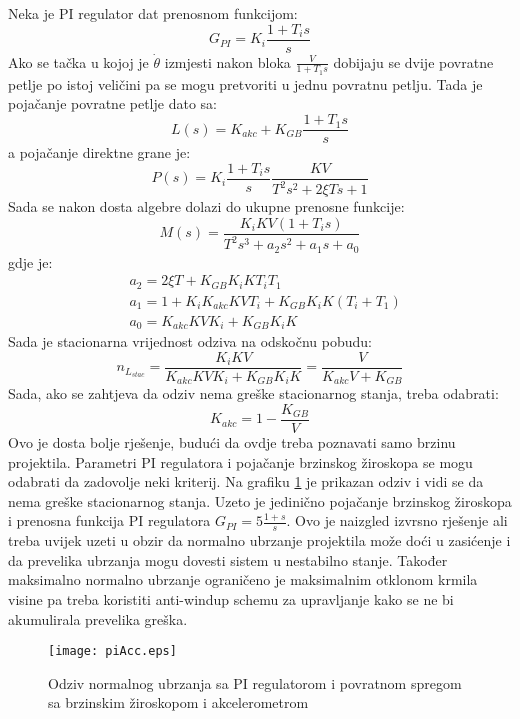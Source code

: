 Neka je PI regulator dat prenosnom funkcijom:
\begin{equation}
    G_{PI} = K_i\frac{1+T_is}{s}
\end{equation}
Ako se tačka u kojoj je $\dot{\theta}$ izmjesti nakon bloka $\frac{V}{1+T_1s}$ dobijaju se 
dvije povratne petlje po istoj veličini pa se mogu pretvoriti u jednu povratnu petlju. Tada je 
pojačanje povratne petlje dato sa:
\begin{equation}
    L(s) = K_{akc}+K_{GB}\frac{1+T_1s}{s}
\end{equation}
a pojačanje direktne grane je:
\begin{equation}
    P(s)=K_i\frac{1+T_is}{s}\frac{KV}{T^2s^2+2\xi Ts+1}
\end{equation}
Sada se nakon dosta algebre dolazi do ukupne prenosne funkcije:
\begin{equation}
    M(s)=\frac{K_iKV(1+T_is)}{T^2s^3+a_2s^2+a_1s + a_0}
\end{equation}
gdje je:
\begin{align*}
    & a_2 = 2\xi T+K_{GB}K_iKT_iT_1 \\
    & a_1 = 1+K_iK_{akc}KVT_i+K_{GB}K_iK(T_i+T_1)\\
    & a_0 = K_{akc}KVK_i+K_{GB}K_iK
\end{align*}
Sada je stacionarna vrijednost odziva na odskočnu pobudu:
\begin{equation}
    n_{L_{stac}} = \frac{K_iKV}{K_{akc}KVK_i+K_{GB}K_iK} = \frac{V}{K_{akc}V+K_{GB}}
\end{equation}
Sada, ako se zahtjeva da odziv nema greške stacionarnog stanja, treba odabrati:
\begin{equation}
    K_{akc} = 1-\frac{K_{GB}}{V}
\end{equation}
Ovo je dosta bolje rješenje, budući da ovdje treba poznavati samo brzinu projektila. Parametri 
PI regulatora i pojačanje brzinskog žiroskopa se mogu odabrati da zadovolje neki kriterij. 
Na grafiku \ref{fig:piAcc} je prikazan odziv i vidi se da nema greške stacionarnog stanja. 
Uzeto je jedinično pojačanje brzinskog žiroskopa i prenosna funkcija PI regulatora $G_{PI}=5\frac{1+s}{s}$. 
Ovo je naizgled izvrsno rješenje ali treba uvijek uzeti u obzir da normalno ubrzanje projektila 
može doći u zasićenje i da prevelika ubrzanja mogu dovesti sistem u nestabilno stanje. Također 
maksimalno normalno ubrzanje ograničeno je maksimalnim otklonom krmila visine pa treba koristiti 
anti-windup schemu za upravljanje kako se ne bi akumulirala prevelika greška.  
\begin{figure}[!ht]
    \centering
    \texttt{[image: piAcc.eps]}
    \caption{Odziv normalnog ubrzanja sa PI regulatorom i povratnom spregom 
    sa brzinskim žiroskopom i akcelerometrom}
    \label{fig:piAcc}
\end{figure}
